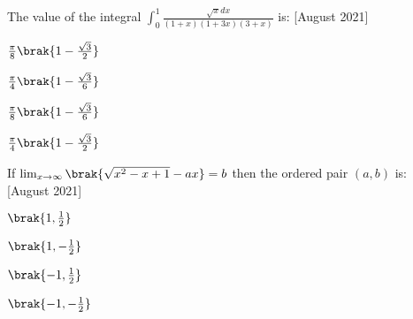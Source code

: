     \item The value of the integral $\int_0^1 \frac{\sqrt{x}dx}{(1+x)(1+3x)(3+x)}$ is: \hfill [August 2021]
    \begin{enumerate}
        \begin{multicols}{4}
        \item $\frac{\pi}{8} \brak{1 - \frac{\sqrt{3}}{2}}$
        \item $\frac{\pi}{4} \brak{1 - \frac{\sqrt{3}}{6}}$
        \item $\frac{\pi}{8} \brak{1 - \frac{\sqrt{3}}{6}}$
        \item $\frac{\pi}{4} \brak{1 - \frac{\sqrt{3}}{2}}$ 
        \end{multicols}
    \end{enumerate}
    \item If $\lim_{x\to\infty} \brak{\sqrt{x^2 - x + 1} - ax} = b $ 
      then the ordered pair $(a,b)$ is: \hfill [August 2021]
    \begin{enumerate}
        \begin{multicols}{2}
            \item $\brak{1, \frac{1}{2}}$
            \item $\brak{1, -\frac{1}{2}}$
            \item $\brak{-1, \frac{1}{2}}$
            \item $\brak{-1, -\frac{1}{2}}$
        \end{multicols}
    \end{enumerate}